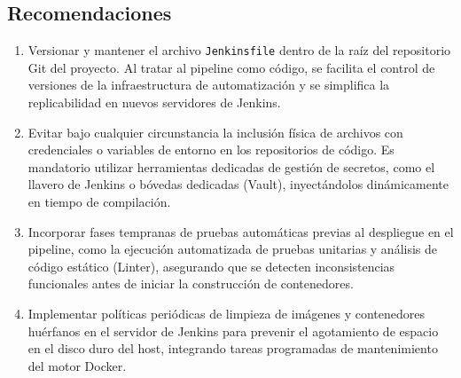 \documentclass{article}
\begin{document}
\subsection{Recomendaciones}
\begin{enumerate}
    \item Versionar y mantener el archivo \texttt{Jenkinsfile} dentro de la raíz del repositorio Git del proyecto. Al tratar al pipeline como código, se facilita el control de versiones de la infraestructura de automatización y se simplifica la replicabilidad en nuevos servidores de Jenkins.
    \item Evitar bajo cualquier circunstancia la inclusión física de archivos con credenciales o variables de entorno en los repositorios de código. Es mandatorio utilizar herramientas dedicadas de gestión de secretos, como el llavero de Jenkins o bóvedas dedicadas (Vault), inyectándolos dinámicamente en tiempo de compilación.
    \item Incorporar fases tempranas de pruebas automáticas previas al despliegue en el pipeline, como la ejecución automatizada de pruebas unitarias y análisis de código estático (Linter), asegurando que se detecten inconsistencias funcionales antes de iniciar la construcción de contenedores.
    \item Implementar políticas periódicas de limpieza de imágenes y contenedores huérfanos en el servidor de Jenkins para prevenir el agotamiento de espacio en el disco duro del host, integrando tareas programadas de mantenimiento del motor Docker.
\end{enumerate}



\end{document}
